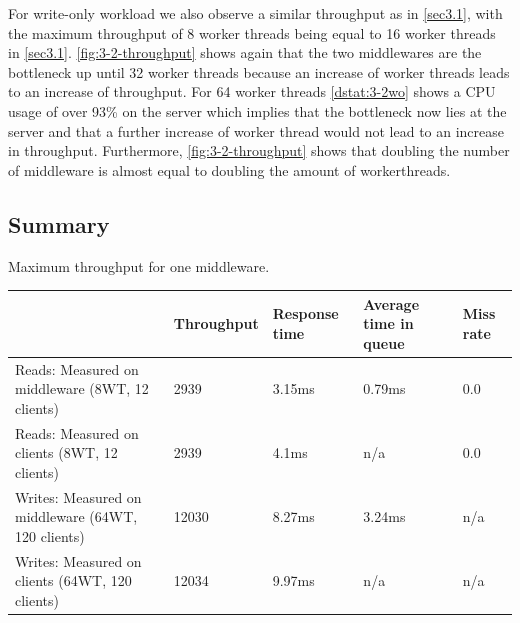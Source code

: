 \documentclass[11pt,a4paper]{article}
\begin{document}
For write-only workload we also observe a similar throughput as in \autoref{sec3.1}, with the maximum throughput of 8 worker threads being equal to 16 worker threads in \autoref{sec3.1}. \autoref{fig:3-2-throughput} shows again that the two middlewares are the bottleneck up until 32 worker threads because an increase of worker threads leads to an increase of throughput. For 64 worker threads \autoref{dstat:3-2wo} shows a CPU usage of over 93\% on the server which implies that the bottleneck now lies at the server and that a further increase of worker thread would not lead to an increase in throughput.
Furthermore, \autoref{fig:3-2-throughput} shows that doubling the number of middleware is almost equal to doubling the amount of workerthreads.


\subsection{Summary}



\begin{center}
	{Maximum throughput for one middleware.}
	\begin{tabular}{|l|p{2cm}|p{2cm}|p{2cm}|p{2cm}|}
		\hline                                                   & Throughput     & Response time & Average time in queue & Miss rate \\ 
		\hline Reads: Measured on middleware (8WT, 12 clients)   &     2939       &    3.15ms     & 0.79ms                & 0.0       \\ 
		\hline Reads: Measured on clients (8WT, 12 clients)      &     2939       &    4.1ms      & n/a                   & 0.0       \\ 
		\hline Writes: Measured on middleware (64WT, 120 clients)&     12030      &    8.27ms     & 3.24ms                & n/a       \\ 
		\hline Writes: Measured on clients (64WT, 120 clients)   &     12034      &    9.97ms     & n/a                   & n/a       \\ 
		\hline 
	\end{tabular}
\end{center}
\end{document}
